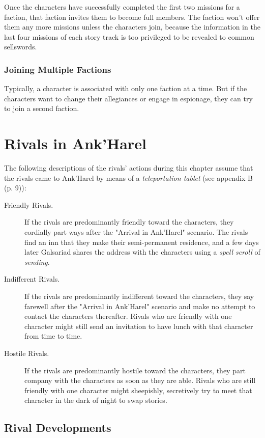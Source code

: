 \documentclass[letterpaper, 11pt, bg=full, twocolumn]{dndbook}
\begin{document}
Once the characters have successfully completed the first two missions for a faction, that faction invites them to become full members. The faction won't offer them any more missions unless the characters join, because the information in the last four missions of each story track is too privileged to be revealed to common sellswords.

\subsubsection{Joining Multiple Factions}

Typically, a character is associated with only one faction at a time. But if the characters want to change their allegiances or engage in espionage, they can try to join a second faction.
\section{Rivals in Ank'Harel}

The following descriptions of the rivals' actions during this chapter assume that the rivals came to Ank'Harel by means of a \textit{teleportation tablet} (see appendix B (p. 9)):

\begin{description}
\item[Friendly Rivals.] If the rivals are predominantly friendly toward the characters, they cordially part ways after the "Arrival in Ank'Harel" scenario. The rivals find an inn that they make their semi-permanent residence, and a few days later Galsariad shares the address with the characters using a \textit{spell scroll} of \textit{sending}.
\item[Indifferent Rivals.] If the rivals are predominantly indifferent toward the characters, they say farewell after the "Arrival in Ank'Harel" scenario and make no attempt to contact the characters thereafter. Rivals who are friendly with one character might still send an invitation to have lunch with that character from time to time.
\item[Hostile Rivals.] If the rivals are predominantly hostile toward the characters, they part company with the characters as soon as they are able. Rivals who are still friendly with one character might sheepishly, secretively try to meet that character in the dark of night to swap stories.
\end{description}

\subsection{Rival Developments}
\end{document}
